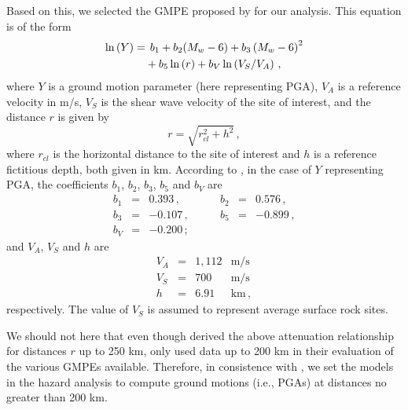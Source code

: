 Based on this, we selected the GMPE proposed by \citet{Kalkan2004} for our analysis. This equation is of the form
% 
\begin{align}
	\ln \left( Y \right) =
		& \hspace{1ex} b_1 + b_2(M_w - 6) + b_3 \left( M_w - 6 \right)^{2} \nonumber \\ 
		& + b_5 \ln \left( r \right) + b_V \ln \left( V_S / V_A \right)
	\, ,
\end{align}
% 
where $Y$ is a ground motion parameter (here representing PGA), $V_A$ is a reference velocity in m/s, $V_S$ is the shear wave velocity of the site of interest, and the distance $r$ is given by
% 
\begin{equation}
	r= \sqrt{ r^2_{\mathit{cl}} + h^2 }
	\, ,
\end{equation}
% 
where $r_{\mathit{cl}}$ is the horizontal distance to the site of interest and $h$ is a reference fictitious depth, both given in km. According to \citet{Kalkan2004}, in the case of $Y$ representing PGA, the coefficients $b_1$, $b_2$, $b_3$, $b_5$ and $b_V$ are
% 
\begin{equation}
\begin{array}{lcrlcr} 
	b_1 &=&  0.393   \,,&\hspace{2em}   b_2 &=& 0.576\,,   \\
	b_3 &=& -0.107   \,,&\hspace{2em}   b_5 &=& -0.899\,,  \\
	b_V &=& -0.200   \,; 
	\nonumber
\end{array}
\end{equation}
% 
and $V_A$, $V_S$ and $h$ are
% 
\begin{equation}
\begin{array}{lcrl} 
	V_A &=& 1,112 & \mathrm{m/s}	\\
	V_S &=&   700 & \mathrm{m/s}	\\
	h   &=&  6.91 & \mathrm{km}\,,
	\nonumber
\end{array}
\end{equation}
% 
respectively. The value of $V_S$ is assumed to represent average surface rock sites.

We should not here that even though \citet{Kalkan2004} derived the above attenuation relationship for distances $r$ up to 250 km, \citet{Zafarani2014} only used data up to 200 km in their evaluation of the various GMPEs available. Therefore, in consistence with \citet{Zafarani2014}, we set the models in the hazard analysis to compute ground motions (i.e., PGAs) at distances no greater than 200 km.

